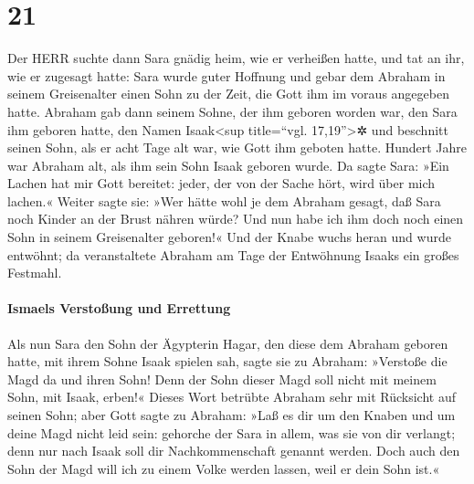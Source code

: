 \hypertarget{section-20}{%
\section{21}\label{section-20}}

 Der HERR suchte dann Sara gnädig heim, wie er verheißen
hatte, und tat an ihr, wie er zugesagt hatte:  Sara wurde
guter Hoffnung und gebar dem Abraham in seinem Greisenalter einen Sohn
zu der Zeit, die Gott ihm im voraus angegeben hatte. 
Abraham gab dann seinem Sohne, der ihm geboren worden war, den Sara ihm
geboren hatte, den Namen Isaak\textless sup title=``vgl.
17,19''\textgreater✲  und beschnitt seinen Sohn, als er
acht Tage alt war, wie Gott ihm geboten hatte.  Hundert
Jahre war Abraham alt, als ihm sein Sohn Isaak geboren wurde.
 Da sagte Sara: »Ein Lachen hat mir Gott bereitet: jeder,
der von der Sache hört, wird über mich lachen.«  Weiter
sagte sie: »Wer hätte wohl je dem Abraham gesagt, daß Sara noch Kinder
an der Brust nähren würde? Und nun habe ich ihm doch noch einen Sohn in
seinem Greisenalter geboren!«  Und der Knabe wuchs heran
und wurde entwöhnt; da veranstaltete Abraham am Tage der Entwöhnung
Isaaks ein großes Festmahl.

\hypertarget{ismaels-verstouxdfung-und-errettung}{%
\paragraph{Ismaels Verstoßung und
Errettung}\label{ismaels-verstouxdfung-und-errettung}}

 Als nun Sara den Sohn der Ägypterin Hagar, den diese dem
Abraham geboren hatte, mit ihrem Sohne Isaak spielen sah,
 sagte sie zu Abraham: »Verstoße die Magd da und ihren
Sohn! Denn der Sohn dieser Magd soll nicht mit meinem Sohn, mit Isaak,
erben!«  Dieses Wort betrübte Abraham sehr mit Rücksicht
auf seinen Sohn;  aber Gott sagte zu Abraham: »Laß es dir
um den Knaben und um deine Magd nicht leid sein: gehorche der Sara in
allem, was sie von dir verlangt; denn nur nach Isaak soll dir
Nachkommenschaft genannt werden.  Doch auch den Sohn der
Magd will ich zu einem Volke werden lassen, weil er dein Sohn ist.«

